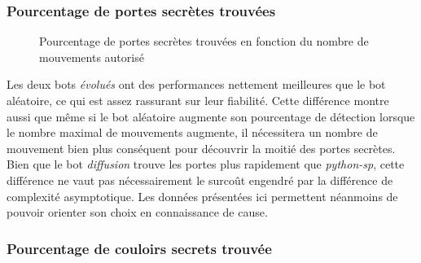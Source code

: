 \documentclass[a4paper,12pt]{article}
\begin{document}
\subsubsection{Pourcentage de portes secrètes trouvées}

\begin{figure}[H]
  \caption{\label{fig:sdoors_found} Pourcentage de portes secrètes trouvées en
    fonction du nombre de mouvements autorisé}
\end{figure}

Les deux bots {\em évolués} ont des performances nettement meilleures que le bot
aléatoire, ce qui est assez rassurant sur leur fiabilité. Cette différence
montre aussi que même si le bot aléatoire augmente son pourcentage de détection
lorsque le nombre maximal de mouvements augmente, il nécessitera un nombre de
mouvement bien plus conséquent pour découvrir la moitié des portes secrètes.
\\
Bien que le bot {\em diffusion} trouve les portes plus rapidement que
{\em python-sp}, cette différence ne vaut pas nécessairement le surcoût engendré
par la différence de complexité asymptotique. Les données présentées ici
permettent néanmoins de pouvoir orienter son choix en connaissance de cause.

\subsubsection{Pourcentage de couloirs secrets trouvée}
\end{document}
